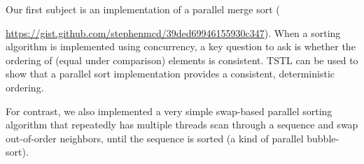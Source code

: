 Our first subject is an implementation of a parallel merge
sort ({\url{https://gist.github.com/stephenmcd/39ded69946155930c347}). When a sorting
algorithm is implemented using concurrency, a key question to ask is
whether the ordering of (equal under comparison) elements is
consistent.  TSTL can be used to show that a parallel sort implementation provides
a consistent, deterministic ordering.

For contrast, we also 
implemented a very simple swap-based parallel sorting algorithm that
repeatedly has multiple threads scan through a sequence and swap
out-of-order neighbors, until the sequence is sorted (a kind of
parallel bubble-sort).

}
